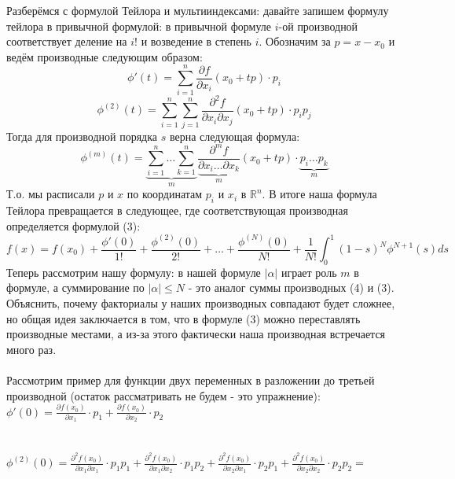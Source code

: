 \documentclass[book, 11pt]{report}
\begin{document}
        \par{Разберёмся с формулой Тейлора и мультииндексами: давайте запишем формулу тейлора в привычной формулой: в привычной формуле $i$-ой производной соответствует деление на $i!$ и возведение в степень $i$.
        \newpage
        Обозначим за $p=x-x_0$ и ведём производные следующим образом:
        \begin{equation*}
            \phi'(t)=\sum_{i=1}^n\frac{\partial f}{\partial x_i}(x_0+tp)\cdot p_i
        \end{equation*}
        \begin{equation*}
            \phi^{(2)}(t)=\sum_{i=1}^n\sum_{j=1}^n\frac{\partial^2 f}{\partial x_i\partial x_j}(x_0+tp)\cdot p_ip_j
        \end{equation*}
        Тогда для производной порядка $s$ верна следующая формула:
        \begin{equation}
            \phi^{(m)}(t)=\underbrace{\sum_{i=1}^n\ldots\sum_{k=1}^n}_{m}\frac{\partial^m f}{\underbrace{\partial x_i\ldots\partial x_k}_{m}}(x_0+tp)\cdot \underbrace{p_i\ldots p_k}_{m}
        \end{equation}
        Т.о. мы расписали $p$ и $x$ по координатам $p_i$ и $x_i$ в $\mathbb{R}^n$. В итоге наша формула Тейлора превращается в следующее, где соответствующая производная определяется формулой (3):
        \begin{equation}
            f(x)=f(x_0)+\frac{\phi'(0)}{1!}+\frac{\phi^{(2)}(0)}{2!}+\ldots+\frac{\phi^{(N)}(0)}{N!}+\frac{1}{N!}\int_{0}^{1}(1-s)^N\phi^{N+1}(s)ds
        \end{equation}
        Теперь рассмотрим нашу формулу: в нашей формуле $|\alpha|$ играет роль $m$ в формуле, а суммирование по $|\alpha|\leq N$ - это аналог суммы производных (4) и (3). Объяснить, почему факториалы у наших производных совпадают будет сложнее, но общая идея заключается в том, что в формуле (3) можно переставлять производные местами, а из-за этого фактически наша производная встречается много раз. \\
        \\
        Рассмотрим пример для функции двух переменных в разложении до третьей производной (остаток рассматривать не будем - это упражнение):\\
        $\displaystyle \phi'(0)=\frac{\partial f(x_0)}{\partial x_1}\cdot p_1+\frac{\partial f(x_0)}{\partial x_2}\cdot p_2$ \\
        \\ \\
        $\displaystyle \phi^{(2)}(0)=\frac{\partial^2f(x_0)}{\partial x_{1}\partial x_{1}}\cdot p_1p_1+\frac{\partial^2f(x_0)}{\partial x_{1}\partial x_{2}}\cdot p_1p_2+\frac{\partial^2f(x_0)}{\partial x_{2}\partial x_{1}}\cdot p_2p_1+\frac{\partial^2f(x_0)}{\partial x_{2}\partial x_{2}}\cdot p_2p_2=$\\ \\
}
\end{document}
